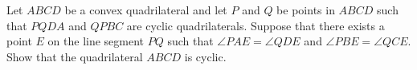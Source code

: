 Let $ABCD$ be a convex quadrilateral and let $P$ and $Q$ be points in $ABCD$ such that $PQDA$ and $QPBC$ are cyclic quadrilaterals. Suppose that there exists a point $E$ on the line segment $PQ$ such that $\angle PAE = \angle QDE$ and $\angle PBE = \angle QCE$. Show that the quadrilateral $ABCD$ is cyclic.
